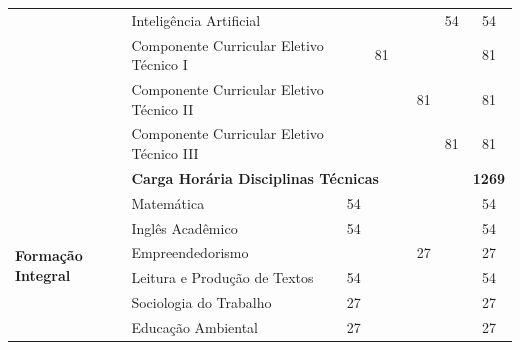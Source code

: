 \documentclass[11pt,fleqn]{book} %
\begin{document}
\begin{table}[]
{\begin{tabular}{|l|l|c|c|c|c|c|c|}
				& Inteligência Artificial                       &                      &                      &                      &                      & 54                   & 54            \\ \cline{2-8} 
				& Componente Curricular Eletivo Técnico I       &                      & 81                   &                      &                      &                      & 81            \\ \cline{2-8} 
				& Componente Curricular Eletivo Técnico II      &                      &                      &                      & 81                   &                      & 81            \\ \cline{2-8} 
				& Componente Curricular Eletivo Técnico III     &                      &                      &                      &                      & 81                   & 81            \\ \cline{2-8} 
				& \multicolumn{6}{l|}{\textbf{Carga Horária Disciplinas Técnicas}}                                                                                                 & \textbf{1269} \\ \hline
				\multirow{17}{*}{\textbf{Formação Integral}}  
				& Matemática                                    & 54                   &                      &                      &                      &                      & 54            \\ \cline{2-8} 
				& Inglês Acadêmico                              & 54                   &                      &                      &                      &                      & 54            \\ \cline{2-8} 
				& Empreendedorismo                              &                      &                      &                      & 27                   &                      & 27            \\ \cline{2-8} 				
				& Leitura e Produção de Textos                  & 54                   &                      &                      &                      &                      & 54            \\ \cline{2-8} 
				& Sociologia do Trabalho                        & 27                   &                      &                      &                      &                      & 27            \\ \cline{2-8} 
				& Educação Ambiental                            & 27                   &                      &                      &                      &                      & 27            \\ \cline{2-8} 

\end{tabular}}
\end{table}
\end{document}
